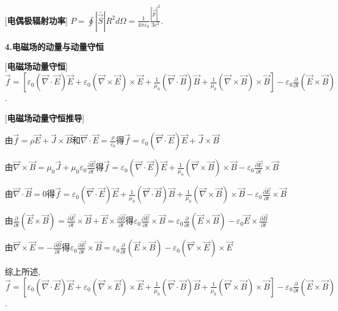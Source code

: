 [\textbf{电偶极辐射功率}] $P=\oint|\bar{\vec S}|R^2d\Omega=\frac{1}{4\pi\varepsilon_0}\frac{|\ddot{\vec p}|^2}{3c^3}$.\par

\begin{center}
 \textbf{4.电磁场的动量与动量守恒}
\end{center}

[\textbf{电磁场动量守恒}] $\vec f=[\varepsilon_0(\vec\nabla\cdot\vec E)\vec E+\varepsilon_0(\vec\nabla\times\vec E)\times\vec E+\frac{1}{\mu_0}(\vec\nabla\cdot\vec B)\vec B+\frac{1}{\mu_0}(\vec\nabla\times\vec B)\times\vec B]-\varepsilon_0\frac{\partial}{\partial t}(\vec E\times\vec B)$.\par

[\textbf{电磁场动量守恒推导}]\par
\qquad 由$\vec f=\rho\vec E+\vec J\times\vec B$和$\vec\nabla\cdot\vec E=\frac{\rho}{\varepsilon_0}$得$\vec f=\varepsilon_0(\vec\nabla\cdot\vec E)\vec E+\vec J\times\vec B$\par
\qquad 由$\vec\nabla\times\vec B=\mu_0\vec J+\mu_0\varepsilon_0\frac{\partial\vec E}{\partial t}$得$\vec f=\varepsilon_0(\vec\nabla\cdot\vec E)\vec E+\frac{1}{\mu_0}(\vec\nabla\times\vec B)\times\vec B-\varepsilon_0\frac{\partial\vec E}{\partial t}\times\vec B$\par
\qquad 由$\vec\nabla\cdot\vec B=0$得$\vec f=\varepsilon_0(\vec\nabla\cdot\vec E)\vec E+\frac{1}{\mu_0}(\vec\nabla\cdot\vec B)\vec B+\frac{1}{\mu_0}(\vec\nabla\times\vec B)\times\vec B-\varepsilon_0\frac{\partial\vec E}{\partial t}\times\vec B$\par
\qquad 由$\frac{\partial}{\partial t}(\vec E\times\vec B)=\frac{\partial\vec E}{\partial t}\times\vec B+\vec E\times\frac{\partial\vec B}{\partial t}$得$\varepsilon_0\frac{\partial\vec E}{\partial t}\times\vec B=\varepsilon_0\frac{\partial}{\partial t}(\vec E\times\vec B)-\varepsilon_0\vec E\times\frac{\partial\vec B}{\partial t}$\par
\qquad 由$\vec\nabla\times\vec E=-\frac{\partial\vec B}{\partial t}$得$\varepsilon_0\frac{\partial\vec E}{\partial t}\times\vec B=\varepsilon_0\frac{\partial}{\partial t}(\vec E\times\vec B)-\varepsilon_0(\vec\nabla\times\vec E)\times\vec E$\par
\qquad 综上所述, $\vec f=[\varepsilon_0(\vec\nabla\cdot\vec E)\vec E+\varepsilon_0(\vec\nabla\times\vec E)\times\vec E+\frac{1}{\mu_0}(\vec\nabla\cdot\vec B)\vec B+\frac{1}{\mu_0}(\vec\nabla\times\vec B)\times\vec B]-\varepsilon_0\frac{\partial}{\partial t}(\vec E\times\vec B)$.\par

